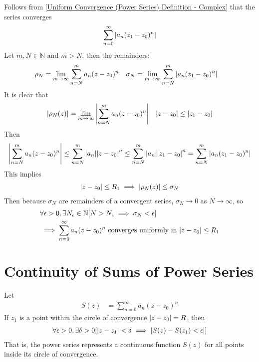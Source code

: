 \documentclass[12pt, english]{book}
\makeatletter
\renewenvironment{proof}[1][\proofname]{\par
	\pushQED{\qed}%
	\normalfont \topsep6\p@\@plus6\p@\relax
	\list{}{%
		\settowidth{\leftmargin}{\itshape\proofname:\hskip\labelsep}%
		\setlength{\labelwidth}{0pt}%
		\setlength{\itemindent}{-\leftmargin}%
	}%
	\item[\hskip\labelsep\itshape#1\@addpunct{:}]\ignorespaces
}{%
	\popQED\endlist\@endpefalse
}
\makeatother
\begin{document}
	\begin{proof}
		Follows from \cref{Uniform Convergence (Power Series) Definition - Complex} that the series converges
		\begin{align*}
			\sum_{n=0}^{\infty} \abs{a_n (z_1 - z_0)^n}
		\end{align*}
		Let \(m, N \in \mathbb{N}\) and \(m > N\), then the remainders: 
		\begin{align*}
			\rho_N &= \lim_{m \rightarrow \infty} \sum_{n=N}^{m} a_n (z-z_0)^n &
			\sigma_N &= \lim_{m \rightarrow \infty} \sum_{n=N}^{m} \abs{a_n (z_1 - z_0)^n}
		\end{align*}
		It is clear that 
		\begin{align*}
			\abs{\rho_N(z)} &= \lim_{m\rightarrow \infty} \abs{\sum_{n=N}^{m} a_n (z-z_0)^n}
				& \abs{z-z_0} \leq \abs{z_1 - z_0}
		\end{align*}
		Then 
		\begin{align*}
			\abs{\sum_{n=N}^{m} a_n (z-z_0)^n} 
			\leq \sum_{n=N}^{m} \abs{a_n} \abs{z-z_0}^n
			\leq \sum_{n=N}^{m} \abs{a_n} \abs{z_1 - z_0}^n
				= \sum_{n=N}^{m} \abs{a_n (z_1 - z_0)^n}
		\end{align*}
		This implies  
		\begin{align*}
			\abs{z-z_0} \leq R_1 \implies \abs{\rho_N (z)} \leq \sigma_N
		\end{align*}
		Then because \(\sigma_N\) are remainders of a convergent series, \(\sigma_N \rightarrow 0\) as \(N \rightarrow \infty\), so
		\begin{align*}
			&\forall \epsilon > 0, \exists N_\epsilon \in \mathbb{N} 
			[N>N_\epsilon \implies \sigma_N < \epsilon] \\
			&\implies \sum_{n=0}^{\infty} a_n (z-z_0)^n \text{ converges uniformly in } \abs{z-z_0}\leq R_1
		\end{align*}
	\end{proof}
	
	\section{Continuity of Sums of Power Series} \label{Continuity of Sums of Power Series Section - Complex}
	
	\begin{theorem}
		\label{Continuity of Sums of Power Series Theorem - Complex}
		Let 
		\begin{align*}
			S(z) &= \sum_{n=0}^{\infty} a_n (z-z_0)^n
		\end{align*}
		If \(z_1\) is a point within the circle of convergence \(\abs{z-z_0}=R\), then 
		\begin{align*}
			\forall \epsilon > 0, \exists \delta > 0
			[ \abs{z-z_1}<\delta \implies \abs{S(z) - S(z_1) < \epsilon}]
		\end{align*}
		That is, the power series represents a continuous function \(S(z)\) for all points inside its circle of convergence.
	\end{theorem}
\end{document}
